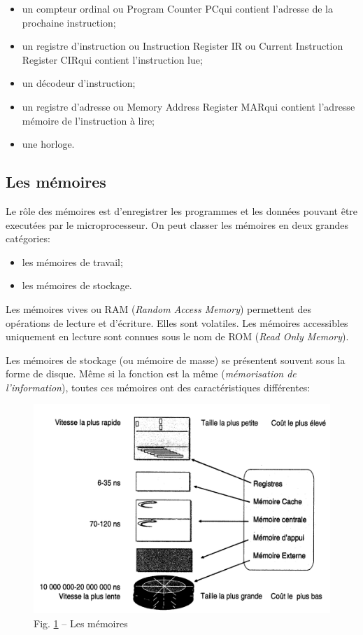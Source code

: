 \documentclass[11pt,french]{article}
\makeatletter
\def\maxwidth{\ifdim\Gin@nat@width>\linewidth\linewidth
    \else\Gin@nat@width\fi}
\let\Oldincludegraphics\includegraphics
\renewcommand{\includegraphics}[1]{\Oldincludegraphics[width=.8\maxwidth]{#1}}
\providecommand{\tightlist}{%
      \setlength{\itemsep}{0pt}\setlength{\parskip}{0pt}}
\makeatother
\begin{document}
\begin{itemize}
\tightlist
\item
  un compteur ordinal ou \og Program Counter PC\fg  qui contient l'adresse
  de la prochaine instruction;
\item
  un registre d'instruction  ou \og Instruction Register IR  ou Current Instruction
  Register CIR\fg qui contient l'instruction lue;
\item
  un décodeur d'instruction;
\item
  un registre d'adresse ou \og Memory Address Register MAR\fg qui contient
  l'adresse mémoire de l'instruction à lire;
\item   une horloge.
\end{itemize}

\hypertarget{les-memoires}{%
\subsection{Les mémoires}\label{les-memoires}}
Le rôle des mémoires est d'enregistrer les programmes et les données pouvant être executées par le microprocesseur. On peut classer les mémoires en deux grandes catégories:
\begin{itemize}
    \item les mémoires de travail;
    \item les mémoires de stockage.
\end{itemize}
Les mémoires vives ou RAM (\textit{Random Access Memory}) permettent des opérations de lecture et d'écriture. Elles sont volatiles. Les mémoires accessibles uniquement en lecture sont connues sous le nom de ROM (\textit{Read Only Memory}).

Les mémoires de stockage (ou mémoire de masse) se présentent souvent sous la forme de disque.
Même si la fonction est la même (\textit{mémorisation de l'information}), toutes ces mémoires ont des caractéristiques différentes:

\begin{figure}[h]
	\begin{center}
		\includegraphics{../img/DiU001.png}
	\end{center}
	\caption{Fig. \ref{fig:memoires} -- Les mémoires}
	\label{fig:memoires}
\end{figure}
\end{document}
